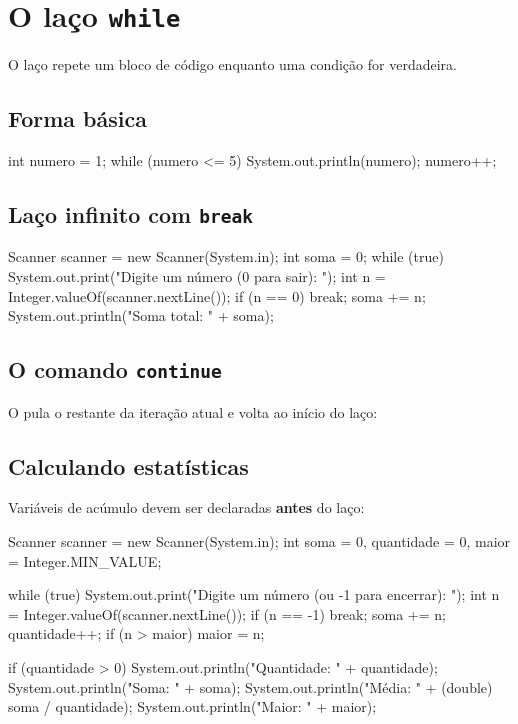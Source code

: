 \documentclass[11pt,a4paper]{article}
\begin{document}
\section{O laço \texttt{while}}

O laço  repete um bloco de código enquanto uma condição for verdadeira.

\subsection{Forma básica}

\begin{javacode}
int numero = 1;
while (numero <= 5) {
    System.out.println(numero);
    numero++;
}
\end{javacode}

\subsection{Laço infinito com \texttt{break}}

\begin{javacode}
Scanner scanner = new Scanner(System.in);
int soma = 0;
while (true) {
    System.out.print("Digite um número (0 para sair): ");
    int n = Integer.valueOf(scanner.nextLine());
    if (n == 0) {
        break;
    }
    soma += n;
}
System.out.println("Soma total: " + soma);
\end{javacode}

\subsection{O comando \texttt{continue}}

O  pula o restante da iteração atual e volta ao início do laço:


\subsection{Calculando estatísticas}

Variáveis de acúmulo devem ser declaradas \textbf{antes} do laço:

\begin{javacode}
Scanner scanner = new Scanner(System.in);
int soma = 0, quantidade = 0, maior = Integer.MIN_VALUE;

while (true) {
    System.out.print("Digite um número (ou -1 para encerrar): ");
    int n = Integer.valueOf(scanner.nextLine());
    if (n == -1) break;
    soma += n;
    quantidade++;
    if (n > maior) maior = n;
}

if (quantidade > 0) {
    System.out.println("Quantidade: " + quantidade);
    System.out.println("Soma: " + soma);
    System.out.println("Média: " + (double) soma / quantidade);
    System.out.println("Maior: " + maior);
}
\end{javacode}
\end{document}
